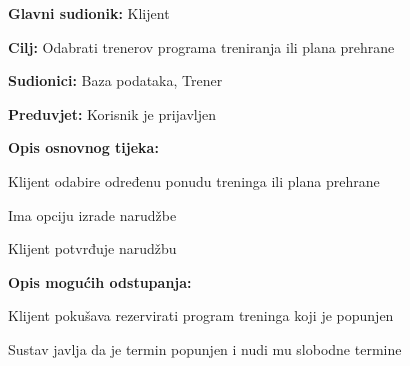 				\noindent {}
				\begin{packed_item}
					
					\item \textbf{Glavni sudionik: } Klijent
					\item  \textbf{Cilj:} Odabrati trenerov programa treniranja ili plana prehrane
					\item  \textbf{Sudionici:} Baza podataka, Trener
					\item  \textbf{Preduvjet:} Korisnik je prijavljen
					\item  \textbf{Opis osnovnog tijeka:}
					
					\item[] \begin{packed_enum}
						
						\item Klijent odabire određenu ponudu treninga ili plana prehrane
						\item Ima opciju izrade narudžbe
						\item Klijent potvrđuje narudžbu
					\end{packed_enum}
					
					\item  \textbf{Opis mogućih odstupanja:}
					
					\item[] \begin{packed_item}
						
						\item[-] Klijent pokušava rezervirati program treninga koji je popunjen
						\item[] \begin{packed_enum}
							
							\item Sustav javlja da je termin popunjen i nudi mu slobodne termine
							
						\end{packed_enum}
						
					\end{packed_item}
				\end{packed_item}
				
